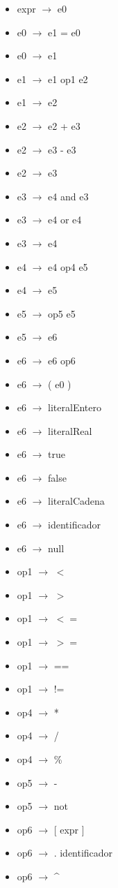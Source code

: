 \documentclass[11pt]{article}
\begin{document}
        \begin{itemize}
            \item expr $\rightarrow$ e0
            \item e0 $\rightarrow$ e1 = e0
            \item e0 $\rightarrow$ e1
            \item e1 $\rightarrow$ e1 op1 e2
            \item e1 $\rightarrow$ e2
            \item e2 $\rightarrow$ e2 + e3
            \item e2 $\rightarrow$ e3 - e3
            \item e2 $\rightarrow$ e3
            \item e3 $\rightarrow$ e4 and e3
            \item e3 $\rightarrow$ e4 or e4
            \item e3 $\rightarrow$ e4
            \item e4 $\rightarrow$ e4 op4 e5
            \item e4 $\rightarrow$ e5
            \item e5 $\rightarrow$ op5 e5
            \item e5 $\rightarrow$ e6
            \item e6 $\rightarrow$ e6 op6
            \item e6 $\rightarrow$ ( e0 )
            \item e6 $\rightarrow$ literalEntero
            \item e6 $\rightarrow$ literalReal
            \item e6 $\rightarrow$ true
            \item e6 $\rightarrow$ false
            \item e6 $\rightarrow$ literalCadena
            \item e6 $\rightarrow$ identificador
            \item e6 $\rightarrow$ null
            \item op1 $\rightarrow$ $<$
            \item op1 $\rightarrow$ $>$
            \item op1 $\rightarrow$ $<=$
            \item op1 $\rightarrow$ $>=$
            \item op1 $\rightarrow$ ==
            \item op1 $\rightarrow$ !=
            \item op4 $\rightarrow$ *
            \item op4 $\rightarrow$ /
            \item op4 $\rightarrow$ \%
            \item op5 $\rightarrow$ -
            \item op5 $\rightarrow$ not
            \item op6 $\rightarrow$ [ expr ]
            \item op6 $\rightarrow$ . identificador
            \item op6 $\rightarrow$ \^{}
        \end{itemize}
\end{document}
